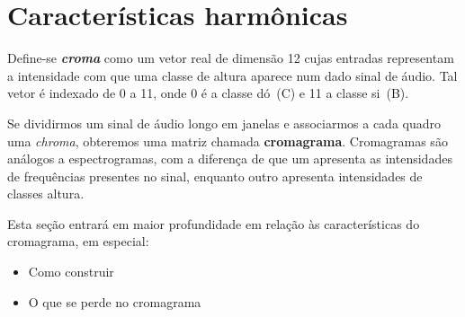 \section{Características harmônicas}
\label{sec:cromagramas}
    Define-se \textbf{\textit{croma}} como um vetor real de dimensão 12 cujas entradas representam a intensidade com que uma classe de altura aparece num dado sinal de áudio. Tal vetor é indexado de 0 a 11, onde 0 é a classe dó~(C) e 11 a classe si~(B).
    
    Se dividirmos um sinal de áudio longo em janelas e associarmos a cada quadro uma \textit{chroma}, obteremos uma matriz chamada \textbf{cromagrama}. Cromagramas são análogos a espectrogramas, com a diferença de que um apresenta as intensidades de frequências presentes no sinal, enquanto outro apresenta intensidades de classes altura.

    Esta seção entrará em maior profundidade em relação às características do cromagrama, em especial:

    \begin{itemize}
        \item Como construir
        \item O que se perde no cromagrama
    \end{itemize}

